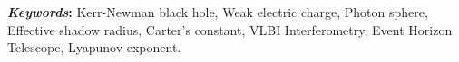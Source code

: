 \vspace{0.5cm}
\raggedright 
{\bf \textit{Keywords}:} Kerr-Newman black hole, Weak electric charge, Photon sphere, Effective shadow radius, Carter's constant, VLBI Interferometry, Event Horizon Telescope, Lyapunov exponent.

